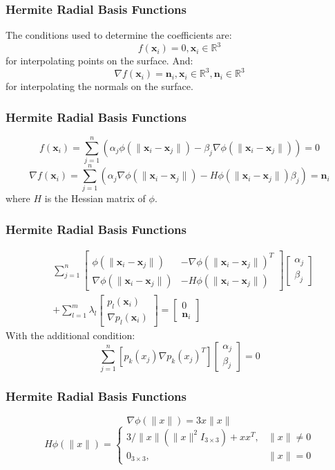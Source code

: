 \documentclass{beamer}
\def\x{\mathbf{x}}
\def\R{\mathbb{R}}
\def\n{\mathbf{n}}
\begin{document}
\begin{frame}
\frametitle{Hermite Radial Basis Functions}
\Large
The conditions used to determine the coefficients are: \[f(\x_i) = 0, \x_i \in \R^3\]
for interpolating points on the surface. And: \[\nabla f(\x_i)=\n_i, \x_i \in \R^3, \n_i \in \R^3\]
for interpolating the normals on the surface.

\end{frame}


\begin{frame}
\frametitle{Hermite Radial Basis Functions}
\Large
\[f(\x_i)=\sum_{j=1}^n(\alpha_j\phi(\|\x_i-\x_j\|)-\beta_j\nabla\phi(\|\x_i-\x_j\|))=0\]
\[\nabla f(\x_i)=\sum_{j=1}^n(\alpha_j\nabla\phi(\|\x_i-\x_j\|)-H\phi(\|\x_i-\x_j\|)\beta_j)=\n_i\]
where $H$ is the Hessian matrix of $\phi$.
\end{frame}


\begin{frame}
	\frametitle{Hermite Radial Basis Functions}
	\Large
	\begin{align} \label{hrbf1}
 & \sum_{j=1}^n
\begin{bmatrix}
\phi(\|\x_i-\x_j\|) & -\nabla\phi(\|\x_i-\x_j\|)^T\\ \nabla\phi(\|\x_i-\x_j\|) & -H\phi(\|\x_i-\x_j\|)
\end{bmatrix}
\begin{bmatrix}
\alpha_j\\\beta_j
\end{bmatrix} \nonumber
\\
 & + \sum_{l=1}^m\lambda_l
\begin{bmatrix}
p_l(\x_i)\\\nabla p_l(\x_i)
\end{bmatrix}
=
\begin{bmatrix}
0 \\ \n_i
\end{bmatrix}
\end{align}
With the additional condition:
\begin{equation} \label{hrbfcond}
\sum_{j=1}^n[p_k(x_j)\nabla p_k(x_j)^T]\begin{bmatrix}\alpha_j\\\beta_j\end{bmatrix}=0
\end{equation}

\end{frame}


\begin{frame}
	\frametitle{Hermite Radial Basis Functions}
	\Large
\[\nabla\phi(\|x\|) = 3x\|x\|\]
\[ H \phi (\|x\|)= \left\{ \begin{array}{ll} 3/\|x\|(\|x\|^2I_{3\times3}) + xx^T, & \|x\| \neq 0\\ 
0_{3\times3}, &\|x\| = 0 \end{array}\right.\]
\end{frame}
\end{document}
